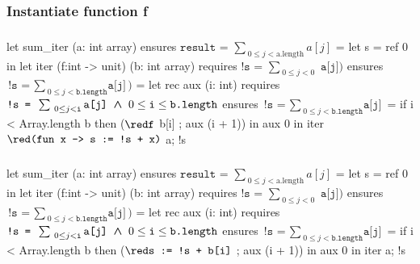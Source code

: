 \subsubsection*{Instantiate function f}
\begin{frame}[fragile]
\frametitle{}
\vspace*{0em}
\begin{footnotesize}
\begin{whycode}
let sum_iter (a: int array) 
ensures { $\texttt{result = }\sum_{~0 \leq j < \text{a.length}} a[j]$ }
= let s = ref 0 in 
  let iter (f:int -> unit) (b: int array)
  requires { ${ \texttt{!s = } \sum_{~0\leq j < 0} \texttt{ a[j]})}$ } 
  ensures  { ${ \texttt{!s = } \sum_{~0\leq j < \texttt{b.length}} \texttt{a[j]}})$ } 
  = let rec aux (i: int)
    requires { ${ \texttt{!s = } \sum_{~0\leq j < \texttt{i}} \texttt{a[j]}} \boldsymbol{~\wedge~} 0 \leq \texttt{i} \leq \texttt{b.length}$ }
    ensures  { ${ \texttt{!s = } \sum_{~0\leq j < \texttt{b.length}} \texttt{a[j]}}$ }
    = if i < Array.length b
      then (${\red\texttt{f}}$ b[i] ; aux (i + 1)) 
    in aux 0
  in iter ${\red\texttt{(fun x -> s := !s + x)}}$ a; 
  !s
\end{whycode}
\end{footnotesize}
\end{frame}
\addtocounter{framenumber}{-1}

\begin{frame}[fragile]
\frametitle{}
\vspace*{0em}
\begin{footnotesize}
\begin{whycode}
let sum_iter (a: int array) 
ensures { $\texttt{result = }\sum_{~0 \leq j < \text{a.length}} a[j]$ }
= let s = ref 0 in 
  let iter (f:int -> unit) (b: int array)
  requires { ${ \texttt{!s = } \sum_{~0\leq j < 0} \texttt{ a[j]})}$ } 
  ensures  { ${ \texttt{!s = } \sum_{~0\leq j < \texttt{b.length}} \texttt{a[j]}})$ } 
  = let rec aux (i: int)
    requires { ${ \texttt{!s = } \sum_{~0\leq j < \texttt{i}} \texttt{a[j]}} \boldsymbol{~\wedge~} 0 \leq \texttt{i} \leq \texttt{b.length}$ }
    ensures  { ${ \texttt{!s = } \sum_{~0\leq j < \texttt{b.length}} \texttt{a[j]}}$ }
    = if i < Array.length b
      then (${\red\texttt{s := !s + b[i]}}$ ; aux (i + 1)) 
    in aux 0
  in iter a; 
  !s
\end{whycode}
\end{footnotesize}
\end{frame}
\addtocounter{framenumber}{-1}


